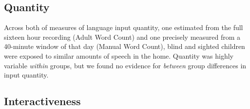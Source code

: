\documentclass[
  man,floatsintext]{apa6}
\begin{document}
\hypertarget{quantity}{%
\subsection{Quantity}\label{quantity}}

Across both of measures of language input quantity, one estimated from the full sixteen hour recording (Adult Word Count) and one precisely measured from a 40-minute window of that day (Manual Word Count), blind and sighted children were exposed to similar amounts of speech in the home. Quantity was highly variable \emph{within} groups, but we found no evidence for \emph{between} group differences in input quantity.

\hypertarget{interactiveness-1}{%
\subsection{Interactiveness}\label{interactiveness-1}}
\end{document}
